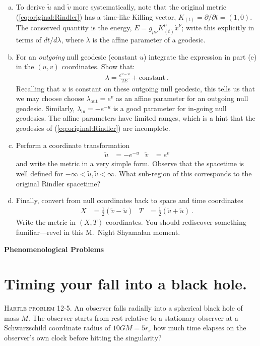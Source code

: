 \documentclass[12pt]{article}
\numberwithin{equation}{section}    %
\renewcommand{\tilde}{\widetilde}   %
\begin{document}
\begin{enumerate}[(a)]
	\item To derive $\tilde u$ and $\tilde v$ more systematically, note that the original metric (\ref{eq:original:Rindler}) has a time-like Killing vector, $K_{(t)} = \partial/\partial t = (1,0)$. The conserved quantity is the energy, $E = g_{\mu\nu} K_{(t)}^\mu \dot x^\nu$; write this explicitly in terms of $dt/d\lambda$, where $\lambda$ is the affine parameter of a geodesic.
	\item For an \emph{outgoing} null geodesic (constant $u$) integrate the expression in part (e) in the $(u,v)$ coordinates. Show that:
	\begin{align}
		\lambda = \frac{e^{v-u}}{2E} + \text{constant} \ .
	\end{align}
 	Recalling that $u$ is constant on these outgoing null geodesic, this tells us that we may choose choose $\lambda_\text{out} = e^{v}$ as an affine parameter for an outgoing null geodesic. Similarly, $\lambda_\text{in} = -e^{-u}$ is a good parameter for in-going null geodesics.  The affine parameters have limited ranges, which is a hint that the geodesics of (\ref{eq:original:Rindler}) are incomplete.
 	\item Perform a coordinate transformation
 	\begin{align}
 		\tilde u &= -e^{-u} 
 		&
 		\tilde v &= e^{v}
 	\end{align}
	and write the metric in a very simple form. Observe that the spacetime is well defined for $-\infty < \tilde u, \tilde v < \infty$. What sub-region of this corresponds to the original Rindler spacetime?
	\item Finally, convert from null coordinates back to space and time coordinates
	\begin{align}
		X &= \frac 12 \left( \tilde v -\tilde u\right)
		&
		T &= \frac 12 \left( \tilde v +\tilde u\right) \ .
	\end{align}
	Write the metric in $(X,T)$ coordinates. You should rediscover something familiar---revel in this M.\ Night Shyamalan moment.
\end{enumerate}

\vspace{2em}
{\Large\textbf{\textsf{Phenomenological Problems}}}

\section{Timing your fall into a black hole.} \textsc{Hartle problem 12-5}. An observer falls radially into a spherical black hole of mass $M$. The observer starts from rest relative to a stationary observer at a Schwarzschild coordinate radius of $10GM = 5r_s$ how much time elapses on the observer's own clock before hitting the singularity?
\end{document}
